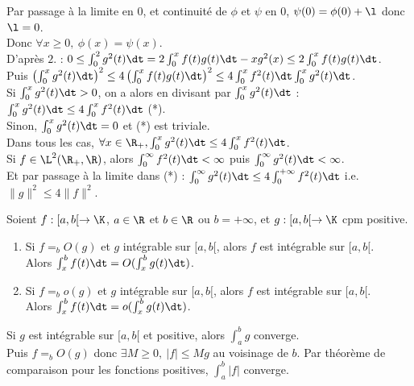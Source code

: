 \documentclass[11pt]{article}
\begin{document}
\begin{ex}{}{}
    Par passage à la limite en 0, et continuité de $\phi$ et $\psi$ en 0, $\psi(0)=\phi(0)+\l$ donc $\l=0$.\\
    Donc $\forall x \geq 0, ~ \phi(x)=\psi(x)$.\\
     D'après $2.$ : $0\leq\int_0^2g^2(t)\dt=2\int_0^xf(t)g(t)\dt-xg^2(x)\leq 2\int_0^xf(t)g(t)\dt$.\\
    Puis $\left( \int_0^xg^2(t)\dt \right)^2\leq 4\left(\int_0^xf(t)g(t)\dt\right)^2\leq 4\int_0^xf^2(t)\dt\int_0^xg^2(t)\dt$.\\
    Si $\int_0^xg^2(t)\dt>0$, on a alors en divisant par $\int_0^xg^2(t)\dt$ : $\int_0^xg^2(t)\dt\leq4\int_0^xf^2(t)\dt$ (*).\\
    Sinon, $\int_0^xg^2(t)\dt=0$ et (*) est triviale.\\
    Dans tous les cas, $\forall x \in \R_+, \int_0^xg^2(t)\dt\leq4\int_0^xf^2(t)\dt$.\\
    Si $f\in\L^2(\R_+,\R)$, alors $\int_0^\infty f^2(t)\dt<\infty$ puis $\int_0^\infty g^2(t)\dt<\infty$.\\
    Et par passage à la limite dans (*) : $\int_0^\infty g^2(t)\dt\leq 4\int_0^{+\infty}f^2(t)\dt$ i.e. $\|g\|^2\leq4\|f\|^2$.
\end{ex}

\begin{thm}{}{}
    Soient $f:[a,b[\to\K$, $a\in\R$ et $b\in\R$ ou $b=+\infty$, et $g:[a,b[\to\K$ cpm positive.
    \begin{enumerate}
        \item Si $f=_b O(g)$ et $g$ intégrable sur $[a,b[$, alors $f$ est intégrable sur $[a,b[$.\\
        Alors $\int_x^b f(t)\dt = O(\int_x^b g(t)\dt)$.
        \item Si $f=_b o(g)$ et $g$ intégrable sur $[a,b[$, alors $f$ est intégrable sur $[a,b[$.\\
        Alors $\int_x^bf(t)\dt=o(\int_x^bg(t)\dt)$.
    \end{enumerate}
    \tcblower
     Si $g$ est intégrable sur $[a,b[$ et positive, alors $\int_a^b g$ converge.\\
    Puis $f=_bO(g)$ donc $\exists M\geq0, ~ |f|\leq Mg$ au voisinage de $b$. Par théorème de comparaison pour les fonctions positives, $\int_a^b|f|$ converge.
\end{thm}
\end{document}
